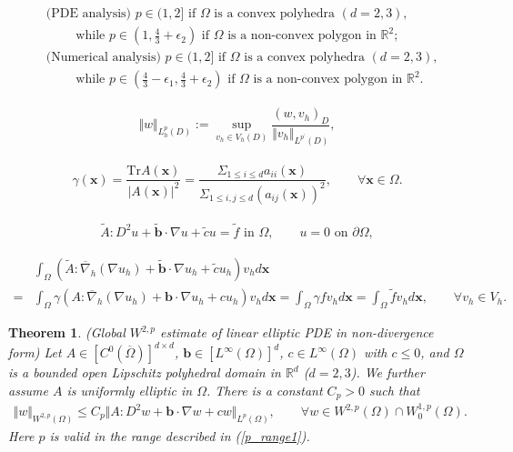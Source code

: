 \documentclass[10pt,a4paper]{amsart}
\newtheorem{theorem}{Theorem}
\newcommand{\boldx}{\boldsymbol{x}}
\begin{document}
\begin{align}
\label{p_range1}
& \text{(PDE analysis) } p \in (1,2]  \text{ if } \Omega  \text{ is a convex polyhedra }(d=2,3), \\
\nonumber
& \qquad \text{ while } p \in (1, \frac{4}{3} + \epsilon_{2}) \text{ if } \Omega 
\text{ is a non-convex polygon in } \mathbb{R}^{2}; \\
\label{p_range2}
& \text{(Numerical analysis) } p \in (1,2]  \text{ if } \Omega  \text{ is a convex polyhedra }(d=2,3), \\
\nonumber 
& \qquad \text{ while } p \in (\frac{4}{3}-\epsilon_{1}, \frac{4}{3} + \epsilon_{2}) \text{ if } \Omega 
\text{ is a non-convex polygon in } \mathbb{R}^{2}.
\end{align}

\begin{align}
\label{discrete_zero_order_norm}
\Vert w\Vert_{L_{h}^{p}(D)}:= \sup_{v_{h} \in V_{h}(D)} \dfrac{(w, v_{h})_{D}}{\Vert v_{h}
\Vert_{L^{p^{\prime}}(D)}},
\end{align} 

\begin{align}
\label{def_gamma}
\gamma(\boldx) = \dfrac{\text{Tr}A(\boldx)}{\vert A(\boldx)\vert^{2}}
 = \dfrac{\Sigma_{1\leq i \leq d}a_{ii}(\boldx)}{\Sigma_{1\leq i,j\leq d}(a_{ij}(\boldx))^{2}}, 
\qquad \forall \boldx \in \Omega.
\end{align}

\begin{align}
\label{nondiv_pde}
\tilde{A}:D^{2}u + \tilde{\boldsymbol{b}}\cdot \nabla u 
+ \tilde{c}u = \tilde{f}  \text{ in } \Omega, \qquad
u = 0 \text{ on } \partial\Omega,
\end{align}

\begin{align}
\label{nondiv_fem}
& \int_{\Omega}(\tilde{A}: \overline{\nabla}_{h}(\nabla u_{h}) + \tilde{\boldsymbol{b}}\cdot \nabla u_{h} 
+ \tilde{c}u_{h} ) v_{h} d\boldx \\
\nonumber 
= & \int_{\Omega} \gamma (A: \overline{\nabla}_{h}(\nabla u_{h}) + \boldsymbol{b}\cdot \nabla u_{h} 
+ cu_{h} ) v_{h} d\boldx 
= \int_{\Omega} \gamma fv_{h} d\boldx = \int_{\Omega} \tilde{f}v_{h} d\boldx, \qquad \forall v_{h} \in V_{h}.
\end{align}

\begin{theorem}
\label{thm_global_A_continuous}
(Global $W^{2,p}$ estimate of linear elliptic PDE in non-divergence form)
Let $A \in [C^{0}(\overline{\Omega})]^{d\times d}$, $\boldsymbol{b}\in 
[L^{\infty}(\Omega)]^{d}$, $c \in L^{\infty}(\Omega)$ with $c \leq 0$, 
 and $\Omega$ is a bounded open Lipschitz polyhedral domain 
in $\mathbb{R}^{d}$ ($d=2,3$).  We further assume $A$ is uniformly elliptic in $\Omega$.
 There is a constant $C_{p}>0$ such that 
\begin{align}
\label{global_w2p_estimate_A_continuous}
\Vert w\Vert_{W^{2,p}(\Omega)} \leq C_{p} \Vert A:D^{2}w  + \boldsymbol{b}\cdot 
\nabla w + c w\Vert_{L^{p}(\Omega)}, 
\qquad \forall w \in W^{2,p}(\Omega) \cap W_{0}^{1,p}(\Omega).
\end{align}
Here $p$ is valid in the range described in (\ref{p_range1}).
\end{theorem}
\end{document}
